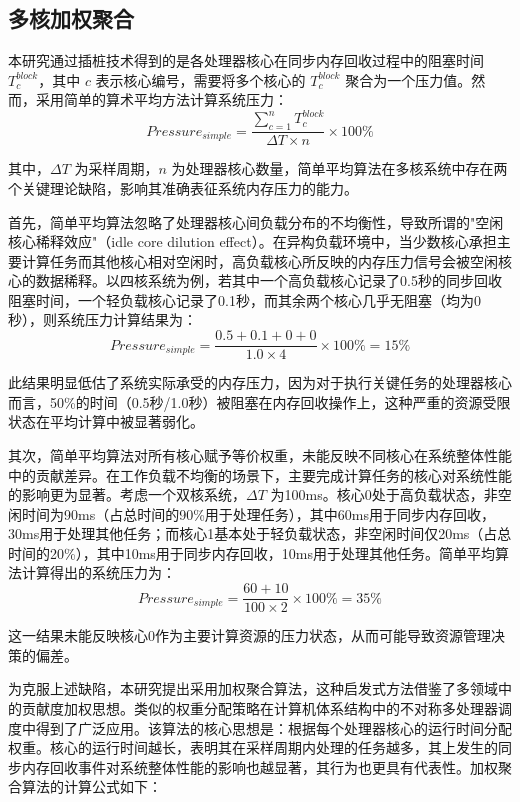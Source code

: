 \subsection{多核加权聚合}
\label{sec:weighted_aggregation}
本研究通过插桩技术得到的是各处理器核心在同步内存回收过程中的阻塞时间 \(T_c^{block}\)，其中 \(c\) 表示核心编号，需要将多个核心的 \(T_c^{block}\) 聚合为一个压力值。然而，采用简单的算术平均方法计算系统压力：
\begin{equation}
    \label{eq:simple_average_pressure}
    Pressure_{simple} = \frac{\sum_{c=1}^{n} T_c^{block}}{\Delta T \times n} \times 100\%
\end{equation}

其中，\(\Delta T\) 为采样周期，\(n\) 为处理器核心数量，简单平均算法在多核系统中存在两个关键理论缺陷，影响其准确表征系统内存压力的能力。

首先，简单平均算法忽略了处理器核心间负载分布的不均衡性，导致所谓的"空闲核心稀释效应"（idle core dilution effect）。在异构负载环境中，当少数核心承担主要计算任务而其他核心相对空闲时，高负载核心所反映的内存压力信号会被空闲核心的数据稀释。以四核系统为例，若其中一个高负载核心记录了0.5秒的同步回收阻塞时间，一个轻负载核心记录了0.1秒，而其余两个核心几乎无阻塞（均为0秒），则系统压力计算结果为：
\[
Pressure_{simple} = \frac{0.5 + 0.1 + 0 + 0}{1.0 \times 4} \times 100\% = 15\%
\]

此结果明显低估了系统实际承受的内存压力，因为对于执行关键任务的处理器核心而言，50\%的时间（0.5秒/1.0秒）被阻塞在内存回收操作上，这种严重的资源受限状态在平均计算中被显著弱化。

其次，简单平均算法对所有核心赋予等价权重，未能反映不同核心在系统整体性能中的贡献差异。在工作负载不均衡的场景下，主要完成计算任务的核心对系统性能的影响更为显著。考虑一个双核系统，\(\Delta T\) 为100ms。核心0处于高负载状态，非空闲时间为90ms（占总时间的90\%用于处理任务），其中60ms用于同步内存回收，30ms用于处理其他任务；而核心1基本处于轻负载状态，非空闲时间仅20ms（占总时间的20\%），其中10ms用于同步内存回收，10ms用于处理其他任务。简单平均算法计算得出的系统压力为：
\[
Pressure_{simple} = \frac{60 + 10}{100 \times 2} \times 100\% = 35\%
\]

这一结果未能反映核心0作为主要计算资源的压力状态，从而可能导致资源管理决策的偏差。

为克服上述缺陷，本研究提出采用加权聚合算法，这种启发式方法借鉴了多领域中的贡献度加权思想。类似的权重分配策略在计算机体系结构中的不对称多处理器调度中得到了广泛应用。该算法的核心思想是：根据每个处理器核心的运行时间分配权重。核心的运行时间越长，表明其在采样周期内处理的任务越多，其上发生的同步内存回收事件对系统整体性能的影响也越显著，其行为也更具有代表性。加权聚合算法的计算公式如下：

